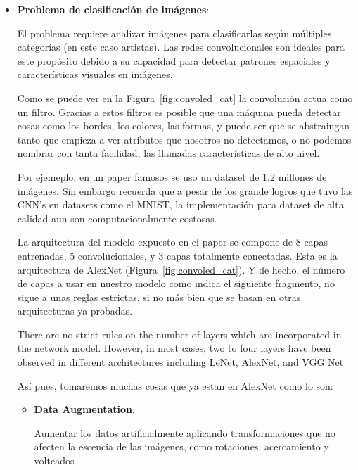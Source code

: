 \documentclass[../main.tex]{subfiles}
\begin{document}
\begin{itemize}

  \item \textbf{Problema de clasificación de imágenes}:
  
  El problema requiere analizar imágenes para clasificarlas según múltiples categorías (en este caso artistas). Las redes convolucionales son ideales para este propósito debido a su capacidad para detectar patrones espaciales y características visuales en imágenes.

  Como se puede ver en la Figura~\ref{fig:convoled_cat} la convolución actua como un filtro. Gracias a estos filtros es posible que una máquina pueda detectar cosas como los bordes, los colores, las formas, y puede ser que se abstraingan tanto que empieza a ver atributos que nosotros no detectamos, o no podemos nombrar con tanta facilidad, las llamadas características de alto nivel.

  Por ejemeplo, en un paper famosos se uso un dataset de 1.2 millones de imágenes. Sin embargo recuerda que a pesar de los grande logros que tuvo las CNN's en datasets como el MNIST, la implementación para dataset de alta calidad aun son computacionalmente costosas.

  La arquitectura del modelo expuesto en el paper se compone de 8 capas entrenadas, 5 convolucionales, y 3 capas totalmente conectadas. Esta es la arquitectura de AlexNet \cite{krizhevsky2012imagenet}  (Figura~\ref{fig:convoled_cat}). Y de hecho, el número de capas a usar en nuestro modelo como indica el siguiente fragmento, no sigue a unas reglas estrictas, si no más bien que se basan en otras arquitecturas ya probadas.

  \begin{displayquote}
    There are no strict rules on the number of layers which are incorporated in the network model. However, in most cases, two to four layers have been observed in different architectures including LeNet, AlexNet, and VGG Net \cite{alom2018history}
  \end{displayquote}

  Así pues, tomaremos muchas cosas que ya estan en AlexNet como lo son:

  \begin{itemize}
    \item \textbf{Data Augmentation}:

    Aumentar los datos artificialmente aplicando transformaciones que no afecten la escencia de las imágenes, como rotaciones, acercamiento y volteados


\end{itemize}
\end{itemize}
\end{document}
